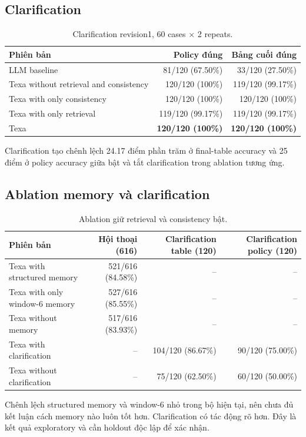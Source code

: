 \documentclass[11pt,a4paper]{article}
\begin{document}
\subsection{Clarification}
\begin{table}[H]\centering\small\caption{Clarification revision1, 60 cases $\times$ 2 repeats.}\begin{tabular}{lrr}\toprule Phiên bản & Policy đúng & Bảng cuối đúng\\\midrule LLM baseline & 81/120 (67.50\%) & 33/120 (27.50\%)\\ Texa without retrieval and consistency & 120/120 (100\%) & 119/120 (99.17\%)\\ Texa with only consistency & 120/120 (100\%) & 120/120 (100\%)\\ Texa with only retrieval & 119/120 (99.17\%) & 119/120 (99.17\%)\\\rowcolor{pale} Texa & \textbf{120/120 (100\%)} & \textbf{120/120 (100\%)}\\\bottomrule\end{tabular}\end{table}
Clarification tạo chênh lệch 24.17 điểm phần trăm ở final-table accuracy và 25 điểm ở policy accuracy giữa bật và tắt clarification trong ablation tương ứng.
\subsection{Ablation memory và clarification}
\begin{table}[H]\centering\small\caption{Ablation giữ retrieval và consistency bật.}\begin{tabular}{lrrr}\toprule Phiên bản & Hội thoại (616) & Clarification table (120) & Clarification policy (120)\\\midrule Texa with structured memory & 521/616 (84.58\%) & -- & --\\ Texa with only window-6 memory & 527/616 (85.55\%) & -- & --\\ Texa without memory & 517/616 (83.93\%) & -- & --\\ Texa with clarification & -- & 104/120 (86.67\%) & 90/120 (75.00\%)\\ Texa without clarification & -- & 75/120 (62.50\%) & 60/120 (50.00\%)\\\bottomrule\end{tabular}\end{table}
Chênh lệch structured memory và window-6 nhỏ trong bộ hiện tại, nên chưa đủ kết luận cách memory nào luôn tốt hơn. Clarification có tác động rõ hơn. Đây là kết quả exploratory và cần holdout độc lập để xác nhận.
\end{document}
